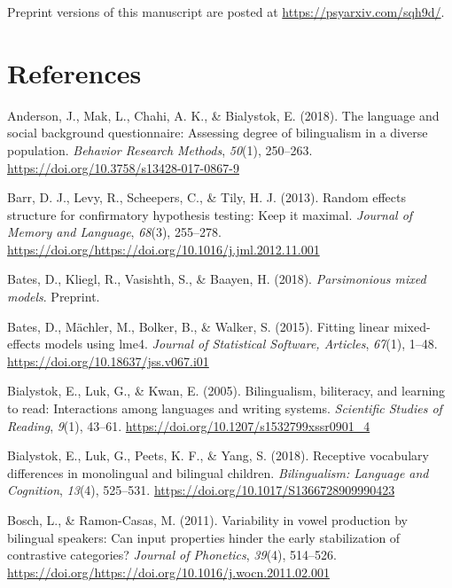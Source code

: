 \documentclass[
  english,
  ,man,floatsintext]{apa6}
\begin{document}
Preprint versions of this manuscript are posted at \url{https://psyarxiv.com/sqh9d/}.

\newpage

\hypertarget{references}{%
\section{References}\label{references}}

\begingroup
\setlength{\parindent}{-0.5in}
\setlength{\leftskip}{0.5in}

\hypertarget{refs}{}
\leavevmode\hypertarget{ref-anderson_2018}{}%
Anderson, J., Mak, L., Chahi, A. K., \& Bialystok, E. (2018). The language and social background questionnaire: Assessing degree of bilingualism in a diverse population. \emph{Behavior Research Methods}, \emph{50}(1), 250--263. \url{https://doi.org/10.3758/s13428-017-0867-9}

\leavevmode\hypertarget{ref-barr_2013}{}%
Barr, D. J., Levy, R., Scheepers, C., \& Tily, H. J. (2013). Random effects structure for confirmatory hypothesis testing: Keep it maximal. \emph{Journal of Memory and Language}, \emph{68}(3), 255--278. \url{https://doi.org/https://doi.org/10.1016/j.jml.2012.11.001}

\leavevmode\hypertarget{ref-bates_2018_parsim}{}%
Bates, D., Kliegl, R., Vasishth, S., \& Baayen, H. (2018). \emph{Parsimonious mixed models}. Preprint.

\leavevmode\hypertarget{ref-bates_2015_fitting}{}%
Bates, D., Mächler, M., Bolker, B., \& Walker, S. (2015). Fitting linear mixed-effects models using lme4. \emph{Journal of Statistical Software, Articles}, \emph{67}(1), 1--48. \url{https://doi.org/10.18637/jss.v067.i01}

\leavevmode\hypertarget{ref-bialystok_2005}{}%
Bialystok, E., Luk, G., \& Kwan, E. (2005). Bilingualism, biliteracy, and learning to read: Interactions among languages and writing systems. \emph{Scientific Studies of Reading}, \emph{9}(1), 43--61. \url{https://doi.org/10.1207/s1532799xssr0901_4}

\leavevmode\hypertarget{ref-bialystok_2018}{}%
Bialystok, E., Luk, G., Peets, K. F., \& Yang, S. (2018). Receptive vocabulary differences in monolingual and bilingual children. \emph{Bilingualism: Language and Cognition}, \emph{13}(4), 525--531. \url{https://doi.org/10.1017/S1366728909990423}

\leavevmode\hypertarget{ref-bosch_2011}{}%
Bosch, L., \& Ramon-Casas, M. (2011). Variability in vowel production by bilingual speakers: Can input properties hinder the early stabilization of contrastive categories? \emph{Journal of Phonetics}, \emph{39}(4), 514--526. \url{https://doi.org/https://doi.org/10.1016/j.wocn.2011.02.001}
\end{document}
